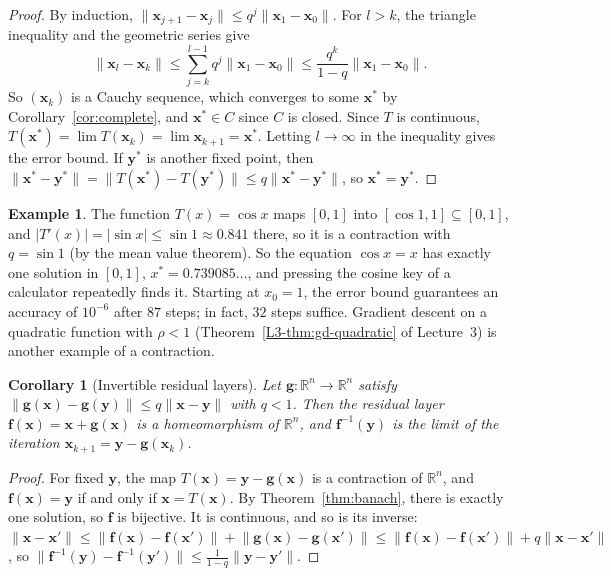 \documentclass[11pt]{article}
\newcommand{\norm}[1]{\lVert #1 \rVert}
\theoremstyle{definition}
\newtheorem{example}[definition]{Example}
\theoremstyle{plain}
\newtheorem{corollary}[definition]{Corollary}
\theoremstyle{remark}
\begin{document}
\begin{proof}
    By induction, $\norm{\mathbf{x}_{j+1} - \mathbf{x}_j} \leq q^j\norm{\mathbf{x}_1 - \mathbf{x}_0}$. For $l > k$, the triangle inequality and the geometric series give
    \[\norm{\mathbf{x}_l - \mathbf{x}_k} \leq \sum_{j=k}^{l-1} q^j\norm{\mathbf{x}_1 - \mathbf{x}_0} \leq \frac{q^k}{1 - q}\norm{\mathbf{x}_1 - \mathbf{x}_0}.\]
    So $(\mathbf{x}_k)$ is a Cauchy sequence, which converges to some $\mathbf{x}^*$ by Corollary~\ref{cor:complete}, and $\mathbf{x}^* \in C$ since $C$ is closed. Since $T$ is continuous, $T(\mathbf{x}^*) = \lim T(\mathbf{x}_k) = \lim \mathbf{x}_{k+1} = \mathbf{x}^*$. Letting $l \to \infty$ in the inequality gives the error bound. If $\mathbf{y}^*$ is another fixed point, then $\norm{\mathbf{x}^* - \mathbf{y}^*} = \norm{T(\mathbf{x}^*) - T(\mathbf{y}^*)} \leq q\norm{\mathbf{x}^* - \mathbf{y}^*}$, so $\mathbf{x}^* = \mathbf{y}^*$.
\end{proof}

\begin{example}\label{ex:dottie}
    The function $T(x) = \cos x$ maps $[0, 1]$ into $[\cos 1, 1] \subseteq [0, 1]$, and $|T'(x)| = |\sin x| \leq \sin 1 \approx 0.841$ there, so it is a contraction with $q = \sin 1$ (by the mean value theorem). So the equation $\cos x = x$ has exactly one solution in $[0, 1]$, $x^* = 0.739085\ldots$, and pressing the cosine key of a calculator repeatedly finds it. Starting at $x_0 = 1$, the error bound guarantees an accuracy of $10^{-6}$ after $87$ steps; in fact, $32$ steps suffice. Gradient descent on a quadratic function with $\rho < 1$ (Theorem~\ref{L3-thm:gd-quadratic} of Lecture~3) is another example of a contraction.
\end{example}

\begin{corollary}[Invertible residual layers]\label{cor:residual}
    Let $\mathbf{g}: \mathbb{R}^n \to \mathbb{R}^n$ satisfy $\norm{\mathbf{g}(\mathbf{x}) - \mathbf{g}(\mathbf{y})} \leq q\norm{\mathbf{x} - \mathbf{y}}$ with $q < 1$. Then the residual layer $\mathbf{f}(\mathbf{x}) = \mathbf{x} + \mathbf{g}(\mathbf{x})$ is a homeomorphism of $\mathbb{R}^n$, and $\mathbf{f}^{-1}(\mathbf{y})$ is the limit of the iteration $\mathbf{x}_{k+1} = \mathbf{y} - \mathbf{g}(\mathbf{x}_k)$.
\end{corollary}

\begin{proof}
    For fixed $\mathbf{y}$, the map $T(\mathbf{x}) = \mathbf{y} - \mathbf{g}(\mathbf{x})$ is a contraction of $\mathbb{R}^n$, and $\mathbf{f}(\mathbf{x}) = \mathbf{y}$ if and only if $\mathbf{x} = T(\mathbf{x})$. By Theorem~\ref{thm:banach}, there is exactly one solution, so $\mathbf{f}$ is bijective. It is continuous, and so is its inverse: $\norm{\mathbf{x} - \mathbf{x}'} \leq \norm{\mathbf{f}(\mathbf{x}) - \mathbf{f}(\mathbf{x}')} + \norm{\mathbf{g}(\mathbf{x}) - \mathbf{g}(\mathbf{x}')} \leq \norm{\mathbf{f}(\mathbf{x}) - \mathbf{f}(\mathbf{x}')} + q\norm{\mathbf{x} - \mathbf{x}'}$, so $\norm{\mathbf{f}^{-1}(\mathbf{y}) - \mathbf{f}^{-1}(\mathbf{y}')} \leq \frac{1}{1 - q}\norm{\mathbf{y} - \mathbf{y}'}$.
\end{proof}
\end{document}
